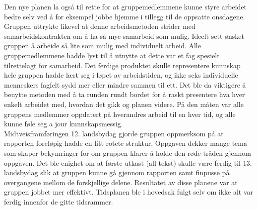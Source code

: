 Den nye planen la også til rette for at gruppemedlemmene kunne styre arbeidet bedre selv ved å for eksempel jobbe hjemme i tillegg til de oppsatte onsdagene.
Gruppen uttrykte likevel at denne arbeidsmetoden strider med samarbeidskontrakten om å ha så mye samarbeid som mulig.
Ideelt sett ønsket gruppen å arbeide så lite som mulig med individuelt arbeid.
Alle gruppemedlemmene hadde lyst til å utnytte at dette var et fag spesielt tilrettelagt for samarbeid.
Det ferdige produktet skulle representere kunnskap hele gruppen hadde lært seg i løpet av arbeidstiden, og ikke seks individuelle menneskers fagfelt sydd mer eller mindre sammen til ett.
Det ble da viktigere å benytte metoden med å ta runden rundt bordet for å raskt presentere hva hver enkelt arbeidet med, hvordan det gikk og planen videre.
På den måten var alle gruppens medlemmer oppdatert på hverandres arbeid til en hver tid, og alle kunne føle seg a jour kunnskapsmessig.\\

Midtveisframføringen 12. landsbydag gjorde gruppen oppmerksom på at rapporten foreløpig hadde en litt rotete struktur.
Oppgaven dekker mange tema som skaper bekymringer for om gruppen klarer å holde den røde tråden gjennom oppgaven.
Det ble enighet om at første utkast (all tekst) skulle være ferdig til 13. landsbydag slik at gruppen kunne gå gjennom rapporten samt finpusse på overgangene mellom de forskjellige delene.
Resultatet av disse planene var at gruppen jobbet mer effektivt.
Tidsplanen ble i hovedsak fulgt selv om ikke alt var ferdig innenfor de gitte tidsrammer.\\

